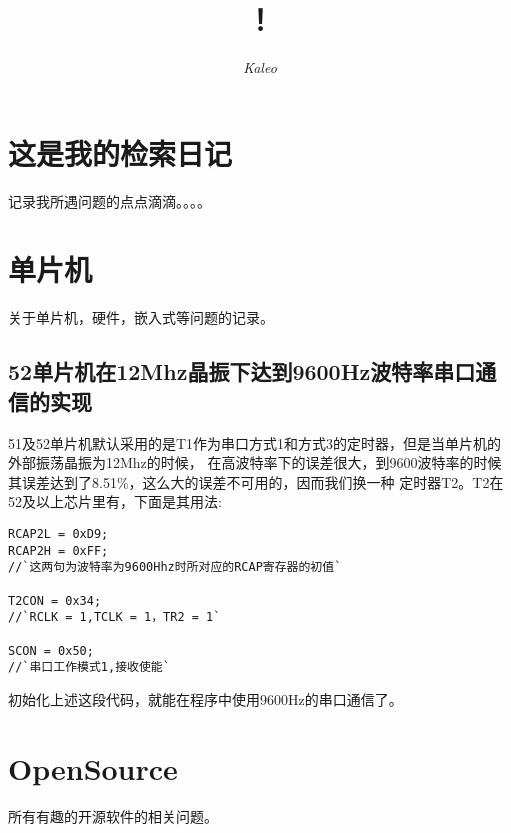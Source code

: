 \documentclass{book}
\begin{document}
\begin{CJK}{UTF8}{gbsn}


\title{\Huge{}！}
\author{\it Kaleo}
\date{}
\maketitle


\renewcommand{\contentsname}{Keywords Index}
\tableofcontents


\chapter*{这是我的检索日记}
记录我所遇问题的点点滴滴。。。。
\newpage


\chapter*{单片机}
关于单片机，硬件，嵌入式等问题的记录。
\newpage


\section*{52单片机在12Mhz晶振下达到9600Hz波特率串口通信的实现}

51及52单片机默认采用的是T1作为串口方式1和方式3的定时器，但是当单片机的外部振荡晶振为12Mhz的时候，
在高波特率下的误差很大，到9600波特率的时候其误差达到了8.51\%，这么大的误差不可用的，因而我们换一种
定时器T2。T2在52及以上芯片里有，下面是其用法:
\begin{lstlisting}
RCAP2L = 0xD9;
RCAP2H = 0xFF;
//`这两句为波特率为9600Hhz时所对应的RCAP寄存器的初值`

T2CON = 0x34;
//`RCLK = 1,TCLK = 1，TR2 = 1`

SCON = 0x50;
//`串口工作模式1,接收使能`
\end{lstlisting}
初始化上述这段代码，就能在程序中使用9600Hz的串口通信了。
\newpage

\chapter*{OpenSource}
所有有趣的开源软件的相关问题。


\end{CJK}
\end{document}

